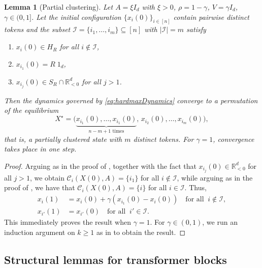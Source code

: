 \documentclass[pdflatex,sn-mathphys-num]{sn-jnl}%
\theoremstyle{thmstyleone}%
\newtheorem{lemma}[theorem]{Lemma}
\theoremstyle{thmstyletwo}%
\theoremstyle{thmstylethree}%
\numberwithin{equation}{section}
\newcommand{\R}{\mathbb{R}}
\begin{document}
\begin{lemma}[Partial clustering]\label{lem:partialConc}
Let $A = \xi I_d$ with $\xi > 0$, \(\rho=1-\gamma\), \(V=\gamma I_d\), \(\gamma\in(0,1]\). Let the initial configuration $\{ x_i(0)\}_{i\in [n]}$ contain pairwise distinct tokens and the subset $\mathcal{I} = \{i_1,\dots,i_m\} \subseteq [n]$ with $|\mathcal{I}|=m$ satisfy
\begin{enumerate}%
    \item[i)] $x_i(0) \in H_R$ for all $i \notin \mathcal{I}$,
    \item[ii)] $x_{i_1}(0) = R \; 1_d$,
    \item[iii)] $x_{i_j}(0) \in S_R \cap \R_{<0}^d$ for all $j > 1$.
\end{enumerate}
Then the dynamics governed by \eqref{eq:hardmaxDynamics} converge to a permutation of the equilibrium
$$
    X^\star = \big(\underbrace{x_{i_1}(0), \dots, x_{i_1}(0)}_{n-m+1\text{ times}}, 
    \, x_{i_2}(0), \dots, x_{i_m}(0)\big),
$$
that is, a partially clustered state with $m$ distinct tokens.
For $\gamma = 1$, convergence takes place in one step.
\end{lemma}
\begin{proof}
Arguing as in the proof of , together with the fact that $x_{i_j}(0) \in \R^d_{<0}$ for all $j > 1$, we obtain $\mathcal{C}_i(X(0), A) = \{ i_1 \}$ for all $i\notin \mathcal{I}$, while arguing as in the proof of , we have that $\mathcal{C}_i(X(0), A) = \{ i \}$ for all $i\in \mathcal{I}$. Thus, 
\begin{align*}
    x_i(1) &= x_i(0) + \gamma (x_{i_1}(0) - x_i(0)) \quad \text{for all} \;\; i\notin \mathcal{I}, \\
    x_{i'}(1) &= x_{i'}(0) \quad \text{for all} \;\; i'\in \mathcal{I}.
\end{align*}
This immediately proves the result when $\gamma = 1$. For $\gamma \in (0,1)$, we run an induction argument on $k\geq 1$ as in  to obtain the result. 
\end{proof}

\subsection{Structural lemmas for transformer blocks}\label{ss:preliminaryTfLemmas}
\end{document}

